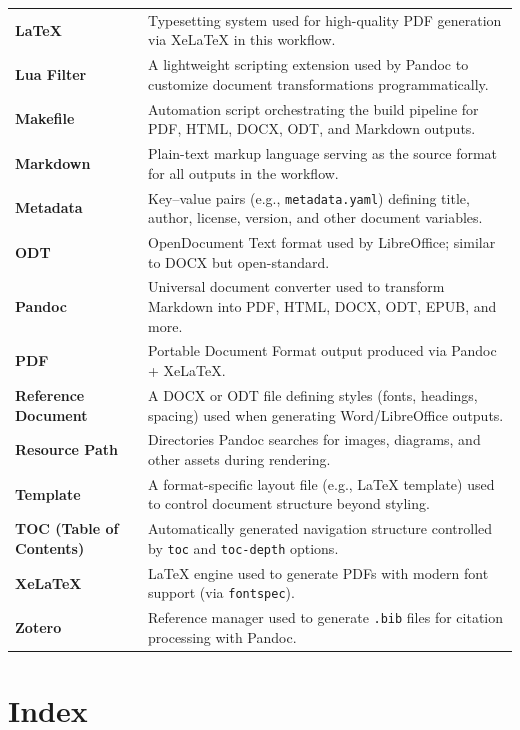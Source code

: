 \documentclass[
  12pt,
  openany]{book}
\begin{document}
{\begin{longtable}[]{@{}
  >{\raggedright\arraybackslash}p{}
  >{\raggedright\arraybackslash}p{}@{}}
\textbf{LaTeX} & Typesetting system used for high-quality PDF generation
via XeLaTeX in this workflow. \\
\textbf{Lua Filter} & A lightweight scripting extension used by Pandoc
to customize document transformations programmatically. \\
\textbf{Makefile} & Automation script orchestrating the build pipeline
for PDF, HTML, DOCX, ODT, and Markdown outputs. \\
\textbf{Markdown} & Plain-text markup language serving as the source
format for all outputs in the workflow. \\
\textbf{Metadata} & Key--value pairs (e.g., \texttt{metadata.yaml})
defining title, author, license, version, and other document
variables. \\
\textbf{ODT} & OpenDocument Text format used by LibreOffice; similar to
DOCX but open-standard. \\
\textbf{Pandoc} & Universal document converter used to transform
Markdown into PDF, HTML, DOCX, ODT, EPUB, and more. \\
\textbf{PDF} & Portable Document Format output produced via Pandoc +
XeLaTeX. \\
\textbf{Reference Document} & A DOCX or ODT file defining styles (fonts,
headings, spacing) used when generating Word/LibreOffice outputs. \\
\textbf{Resource Path} & Directories Pandoc searches for images,
diagrams, and other assets during rendering. \\
\textbf{Template} & A format-specific layout file (e.g., LaTeX template)
used to control document structure beyond styling. \\
\textbf{TOC (Table of Contents)} & Automatically generated navigation
structure controlled by \texttt{toc} and \texttt{toc-depth} options. \\
\textbf{XeLaTeX} & LaTeX engine used to generate PDFs with modern font
support (via \texttt{fontspec}). \\
\textbf{Zotero} & Reference manager used to generate \texttt{.bib} files
for citation processing with Pandoc. \\
\end{longtable}
}

\clearpage
\thispagestyle{plain}

\let\oldclearpage\clearpage
\let\oldcleardoublepage\cleardoublepage
\renewcommand{\clearpage}{}
\renewcommand{\cleardoublepage}{}

\chapter*{Index}
\end{document}
